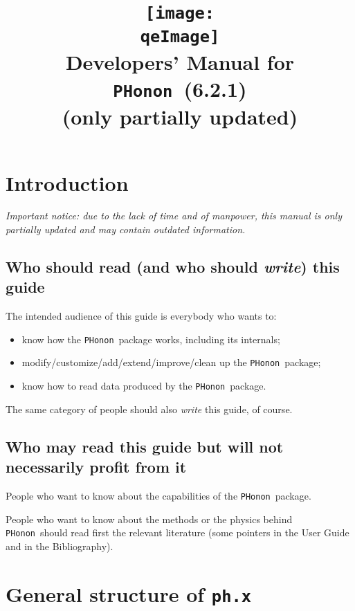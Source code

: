 \documentclass[12pt,a4paper]{article}
\def\version{6.2.1}
\def\qeImage{../../Doc/quantum_espresso.pdf}
\def\phx{\texttt{ph.x}}
\def\PHonon{\texttt{PHonon}}
\begin{document}
 
\author{}
\date{}
\title{
  \texttt{[image: \\qeImage]} \\
  \Huge Developers' Manual for \PHonon\ (\version)
    \\ \Large (only partially updated)
}
\maketitle

\tableofcontents

\newpage

\section{Introduction}

{\em Important notice: due to the lack of time and of manpower, this
manual is only partially updated and may contain outdated information.}

\subsection{Who should read (and who should {\em write}) this guide}

The intended audience of this guide is everybody who wants to:
\begin{itemize}
\item know how the \PHonon\ package works, including its internals;
\item modify/customize/add/extend/improve/clean up the \PHonon\ package;
\item know how to read data produced by the \PHonon\ package.
\end{itemize}
The same category of people should also {\em write} this guide, of course.

\subsection{Who may read this guide but will not necessarily profit from it}

People who want to know about the capabilities of the \PHonon\ package.

People who want to know about the methods or the physics
behind \PHonon\ should read first the relevant  
literature (some pointers in the User Guide and in the Bibliography).


\section{General structure of \phx}
\end{document}
